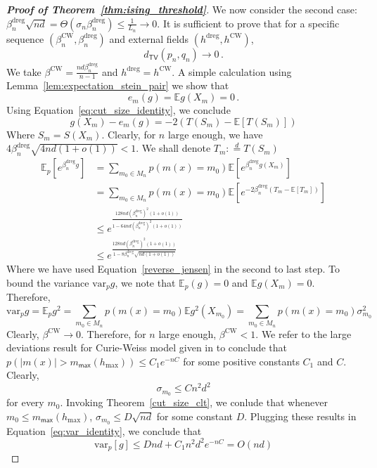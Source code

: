 \documentclass[final,12pt]{colt2018}
\begin{document}
\begin{proof}[\textbf{Proof of Theorem~\ref{thm:ising_threshold}}]
We now consider the second case: $\beta^{\mathrm{dreg}}_n \sqrt{nd} = \Theta(\sigma_n \beta^{\mathrm{dreg}}_n) \leq \frac{1}{ L_n} \to 0 $. It is sufficient to prove that for a specific sequence $(\beta^{\mathrm{CW}}_n, \beta^{\mathrm{dreg}}_n)$ and external fields $(h^{\mathrm{dreg}},h^{\mathrm{CW}})$, $$d_{\mathsf{TV}}(p_n,q_n) \to 0\,.$$
We take $\beta^{\mathrm{CW}} = \frac{nd\beta^{\mathrm{dreg}}_n}{n-1}$ and $h^{\mathrm{dreg}} = h^{\mathrm{CW}}$. A simple calculation using Lemma~\ref{lem:expectation_stein_pair} we show that $$e_m(g) = \mathbb{E}g(X_m) = 0\,.$$ Using Equation~\eqref{eq:cut_size_identity}, we conclude $$g(X_m) - e_m(g) = -2\left(T\left(S_m\right) - \mathbb{E}\left[T\left(S_m\right)\right]\right)$$
Where $S_m = S(X_m)$.
Clearly, for $n$ large enough, we have $4\beta^{\mathrm{dreg}}_n\sqrt{4nd(1+o(1))} <1$. We shall denote $T_m :\stackrel{d}{=} T(S_m)$
\begin{align}
\mathbb{E}_p\left[e^{\beta^{\mathrm{dreg}}_n g}\right] &= \sum_{m_0\in M_n} p\left(m(x) = m_0\right)\mathbb{E}\left[e^{\beta^{\mathrm{dreg}}_n g(X_m)}\right]\nonumber \\
&= \sum_{m_0\in M_n} p\left(m(x) = m_0\right)\mathbb{E}\left[e^{-2\beta^{\mathrm{dreg}}_n \left(T_m- \mathbb{E}\left[T_m\right]\right)}\right]\nonumber \\
&\leq e^{\frac{128nd\left(\beta^{\mathrm{dreg}}_n\right)^2(1+o(1))}{ 1 - 64nd\left(\beta^{\mathrm{dreg}}_n\right)^2(1+o(1))} } \nonumber \\
&\leq e^{\frac{128nd\left(\beta^{\mathrm{dreg}}_n\right)^2(1+o(1))}{ 1 - 8\beta^{\mathrm{dreg}}_n\sqrt{nd(1+o(1))}} }
\label{eq:sub_exp_cut}
\end{align}
Where we have used Equation~\eqref{reverse_jensen} in the second to last step.
To bound the variance $\mathrm{var}_p{g}$, we note that $\mathbb{E}_p(g)  = 0$ and $\mathbb{E}g(X_m) = 0$. Therefore,
\begin{equation}
\mathrm{var}_p{g} = \mathbb{E}_p g^2 = \sum_{m_0 \in M_n}p\left(m(x) = m_0\right) \mathbb{E}g^{2}(X_{m_0}) = \sum_{m_0 \in M_n}p\left(m(x) = m_0\right)\sigma^2_{m_0}
\label{eq:var_identity}
\end{equation}
Clearly, $\beta^{\mathrm{CW}} \to 0$. Therefore, for $n$ large enough, $\beta^{\mathrm{CW}} < 1$. We refer to the large deviations result for Curie-Weiss model given in \citet{ellis2007entropy} to conclude that $p(|m(x)| > m_{\mathsf{max}}(h_{\mathrm{max}})) \leq C_1e^{-nC}$ for some positive constants $C_1$ and $C$. 
Clearly, $$\sigma_{m_0} \leq Cn^2d^2$$ for every $m_0$. Invoking Theorem~\ref{cut_size_clt}, we conlude that whenever $m_0 \leq m_{\mathsf{max}}(h_{\mathrm{max}})$, $\sigma_{m_0} \leq D\sqrt{nd}$ for some constant $D$. Plugging these results in Equation~\eqref{eq:var_identity}, we conclude that
\begin{equation}
\mathrm{var}_p[g] \leq Dnd + C_1n^2d^2e^{-nC}  = O(nd)
\label{eq:var_upper_bound}
\end{equation}


\end{proof}
\end{document}
